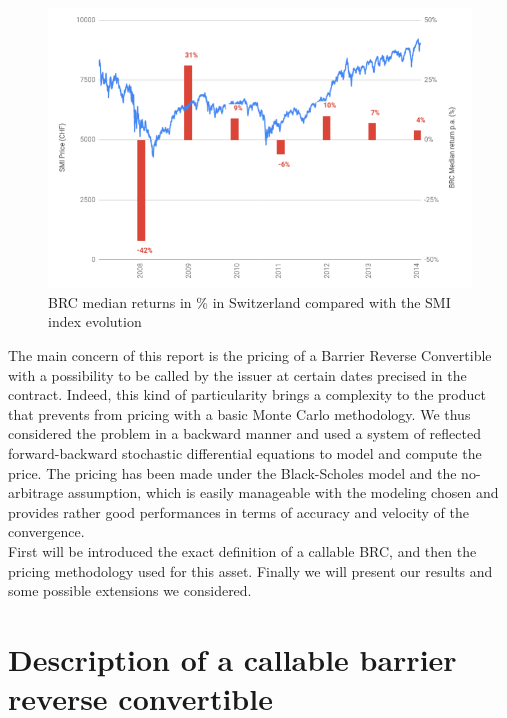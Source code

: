 \documentclass[a4paper,11pt,english]{book}
\begin{document}
\begin{figure}[H] 
    \centering
    \includegraphics[scale=0.4]{images/BRC_median_return.png} 
    \caption{BRC median returns in \% in Switzerland compared with the SMI index evolution}
    \label{fig:median-returns-BRC}
\end{figure}

The main concern of this report is the pricing of a Barrier Reverse Convertible with a possibility to be called by the issuer at certain dates precised in the contract. Indeed, this kind of particularity brings a complexity to the product that prevents from pricing with a basic Monte Carlo methodology. We thus considered the problem in a backward manner and used a system of reflected forward-backward stochastic differential equations to model and compute the price. The pricing has been made under the Black-Scholes model and the no-arbitrage assumption, which is easily manageable with the modeling chosen and provides rather good performances in terms of accuracy and velocity of the convergence. \\

First will be introduced the exact definition of a callable BRC, and then the pricing methodology used for this asset. Finally we will present our results and some possible extensions we considered.  




\pagestyle{fancy}

\chapter{Description of a callable barrier reverse convertible}
\end{document}
